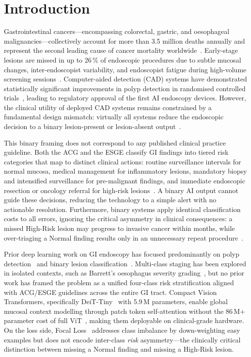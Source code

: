 \documentclass[10pt,a4paper,twocolumn]{article}
\begin{document}
\section{Introduction}
\label{sec:intro}

Gastrointestinal cancers---encompassing colorectal, gastric, and oesophageal
malignancies---collectively account for more than 3.5 million deaths annually
and represent the second leading cause of cancer mortality
worldwide~\citep{Sung2021}. Early-stage lesions are missed in up to 26\,\% of
endoscopic procedures due to subtle mucosal changes, inter-endoscopist
variability, and endoscopist fatigue during high-volume screening
sessions~\citep{Kaminski2017}. Computer-aided detection (CAD) systems have
demonstrated statistically significant improvements in polyp detection in
randomised controlled trials~\citep{Wang2019}, leading to regulatory approval
of the first AI endoscopy devices. However, the clinical utility of deployed
CAD systems remains constrained by a fundamental design mismatch: virtually
all systems reduce the endoscopic decision to a binary lesion-present or
lesion-absent output~\citep{Pogorelov2017}.

This binary framing does not correspond to any published clinical practice
guideline. Both the ACG and the ESGE classify GI findings into tiered risk
categories that map to distinct clinical actions: routine surveillance
intervals for normal mucosa, medical management for inflammatory lesions,
mandatory biopsy and intensified surveillance for pre-malignant findings, and
immediate endoscopic resection or oncology referral for high-risk
lesions~\citep{Shaukat2021,Ferlitsch2017}. A binary AI output cannot guide
these decisions, reducing the technology to a simple alert with no actionable
resolution. Furthermore, binary systems apply identical classification costs
to all errors, ignoring the critical asymmetry in clinical consequences: a
missed High-Risk lesion may progress to invasive cancer within months, while
over-triaging a Normal finding results only in an unnecessary repeat
procedure~\citep{Rawla2019}.

Prior deep learning work on GI endoscopy has focused predominantly on polyp
detection~\citep{Tajbakhsh2016} and binary lesion
classification~\citep{Pogorelov2017}. Multi-class staging has been explored
in isolated contexts, such as Barrett's oesophagus severity
grading~\citep{Ebigbo2019}, but no prior work has framed the problem as a
unified four-class risk stratification aligned with ACG/ESGE guidelines
across the entire GI tract. Compact Vision Transformers, specifically
DeiT-Tiny~\citep{Touvron2021} with 5.9\,M parameters, enable global mucosal
context modelling through patch token self-attention without the 86\,M$+$
parameter cost of full ViT~\citep{Dosovitskiy2021}, making them deployable on
clinical-grade hardware. On the loss side, Focal Loss~\citep{Lin2017}
addresses class imbalance by down-weighting easy examples but does not encode
inter-class \emph{risk} asymmetry---the clinically critical distinction
between missing a Normal finding and missing a High-Risk lesion.
\end{document}
